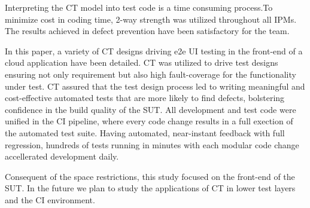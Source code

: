 \documentclass[conference]{IEEEtran}
\begin{document}
Interpreting the CT model into test code is a time consuming process.To minimize cost in coding time, 2-way strength was utilized throughout all IPMs. The results achieved in defect prevention have been satisfactory for the team. 

In this paper, a variety of CT designs driving e2e UI testing in the front-end of a cloud application have been detailed.
CT was utilized to drive test designs ensuring not only requirement but also high fault-coverage for the functionality under test.
CT assured that the test design process led to writing meaningful and cost-effective automated tests that are more likely to find defects, bolstering confidence in the build quality of the SUT.
All development and test code were unified in the CI pipeline, where every code change results in a full exection of the automated test suite.
Having automated, near-instant feedback with full regression, hundreds of tests running in minutes with each modular code change accellerated development daily.

Consequent of the space restrictions, this study focused on the front-end of the SUT. In the future we plan to study the applications of CT in lower test layers and the CI environment. 



\end{document}
